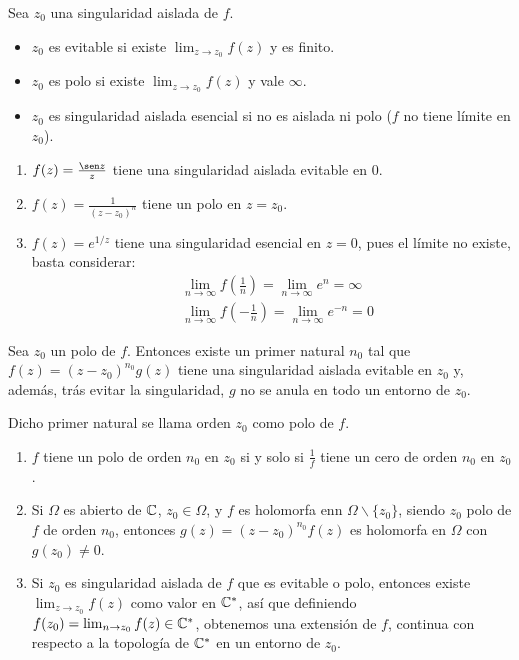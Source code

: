 \begin{defi}
    Sea $z_0$ una singularidad aislada de $f$.
    \begin{itemize}
        \item $z_0$ es evitable si existe $\lim_{z \to z_0} f(z)$ y es finito.
        \item $z_0$ es polo si existe $\lim_{z \to z_0} f(z)$ y vale $\infty$.
        \item $z_0$ es singularidad aislada esencial si no es aislada ni polo ($f$ no tiene límite en $z_0$).
    \end{itemize}
\end{defi}

\begin{ejemplo}
    \begin{enumerate}
        \item $f(z) = \frac{\sen z}{z}$ tiene una singularidad aislada evitable en $0$.
        \item $f(z) = \frac{1}{(z-z_0)^n}$ tiene un polo en $z = z_0$.
        \item $f(z) = e^{1/z}$ tiene una singularidad esencial en $z = 0$, pues el límite no existe, basta considerar:
              \begin{align*}
                   & \lim_{n \to \infty} f\left( \frac{1}{n} \right) = \lim_{n \to \infty} e^n  = \infty \\
                   & \lim_{n \to \infty} f\left(- \frac{1}{n} \right) = \lim_{n \to \infty} e^{-n}  = 0
              \end{align*}
    \end{enumerate}
\end{ejemplo}

\begin{teo}
    Sea $z_0$ un polo de $f$. Entonces existe un primer natural $n_0$ tal que $f(z) = (z-z_0)^{n_0}g(z)$ tiene una singularidad aislada evitable en $z_0$ y, además, trás evitar la singularidad, $g$ no se anula en todo un entorno de $z_0$.

    Dicho primer natural se llama orden $z_0$ como polo de $f$.
\end{teo}

\begin{obs}
    \begin{enumerate}
        \item $f$ tiene un polo de orden $n_0$ en $z_0$ si y solo si $\frac{1}{f}$ tiene un cero de orden $n_0$ en $z_0$.
        \item Si $\Omega$ es abierto de $\mathbb{C}$, $z_0 \in \Omega$, y $f$ es holomorfa enn $\Omega \backslash \{z_0\}$, siendo $z_0$ polo de $f$ de orden $n_0$, entonces $g(z) = (z-z_0)^{n_0}f(z)$ es holomorfa en $\Omega$ con $g(z_0) \not = 0$.
        \item Si $z_0$ es singularidad aislada de $f$ que es evitable o polo, entonces existe $\lim_{z \to z_0} f(z)$ como valor en $\mathbb{C}^*$, así que definiendo $f(z_0) = \lim_{n \to z_0} f(z) \in \mathbb{C}^*$, obtenemos una extensión de $f$, continua con respecto a la topología de $\mathbb{C}^*$ en un entorno de $z_0$.
    \end{enumerate}
\end{obs}


